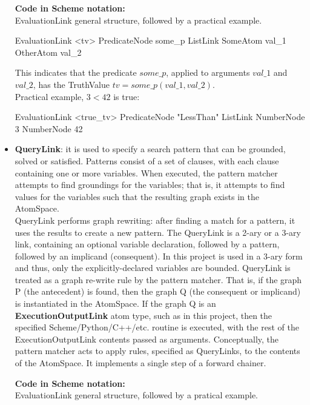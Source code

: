 \begin{itemize}
\begin{footnotesize}\textbf{Code in Scheme notation:} \\
EvaluationLink general structure, followed by a practical example.
\end{footnotesize}
\begin{python}
	EvaluationLink <tv>
   		PredicateNode some_p
   		ListLink
       			SomeAtom val_1
       			OtherAtom val_2
\end{python}
This indicates that the predicate $some\_p$, applied to arguments $val\_1$ and $val\_2$, has the TruthValue $tv = some\_p(val\_1, val\_2)$. \\
Practical example, $3 < 42$ is true:
\begin{python}
	 EvaluationLink <true_tv>
		PredicateNode "LessThan"
		ListLink
			NumberNode 3
			NumberNode 42
\end{python}

	\item \textbf{QueryLink}: it is used to specify a search pattern that can be grounded, solved or satisfied. Patterns consist of a set of clauses, with each clause containing one or more variables. When executed, the pattern matcher attempts to find groundings for the variables; that is, it attempts to find values for the variables such that the resulting graph exists in the AtomSpace. \\
QueryLink performs graph rewriting: after finding a match for a pattern, it uses the results to create a new pattern. 
The QueryLink is a 2-ary or a 3-ary link, containing an optional variable declaration, followed by a pattern, followed by an implicand (consequent). In this project is used in a 3-ary form and thus, only the explicitly-declared variables are bounded. 
QueryLink is treated as a graph re-write rule by the pattern matcher. That is, if the graph P (the antecedent) is found, then the graph Q (the consequent or implicand) is instantiated in the AtomSpace. If the graph Q is an \textbf{ExecutionOutputLink} atom type, such as in this project, then the specified Scheme/Python/C++/etc. routine is executed, with the rest of the ExecutionOutputLink contents passed as arguments. Conceptually, the pattern matcher acts to apply rules, specified as QueryLinks, to the contents of the AtomSpace. It implements a single step of a forward chainer.

\begin{footnotesize}\textbf{Code in Scheme notation:} \\
EvaluationLink general structure, followed by a pratical example.
\end{footnotesize}


\end{itemize}
